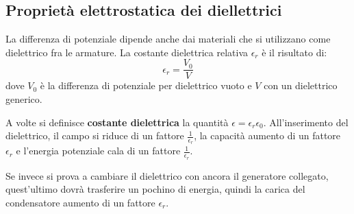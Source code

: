 \subsection{Proprietà elettrostatica dei diellettrici}
La differenza di potenziale dipende anche dai materiali che si utilizzano come
dielettrico fra le armature.
La costante dielettrica relativa $\epsilon_r$ è il risultato di:
\begin{equation*}
    \epsilon_r = \frac{V_0}{V}
\end{equation*}
dove $V_0$ è la differenza di potenziale per dielettrico vuoto e $V$ 
con un dielettrico generico.

A volte si definisce \textbf{costante dielettrica} la quantità 
$\epsilon = \epsilon_r\epsilon_0$.
All'inserimento del dielettrico, il campo si riduce di un fattore 
$\frac{1}{\epsilon_r}$, la capacità aumento di un fattore
$\epsilon_r$ e l'energia potenziale cala di un fattore 
$\frac{1}{\epsilon_r}$.

Se invece si prova a cambiare il dielettrico con ancora il 
generatore collegato, quest'ultimo dovrà trasferire un pochino
di energia, quindi la carica del condensatore aumento di un fattore
$\epsilon_r$.
